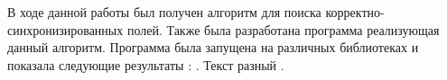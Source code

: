 \startconclusionpage
В ходе данной работы был получен алгоритм для поиска корректно-синхронизированных полей.
Также была разработана программа реализующая данный алгоритм. 
Программа была запущена на различных библиотеках и показала следующие результаты  : .
Текст разный \cite{DRD}. 

\FloatBarrier
